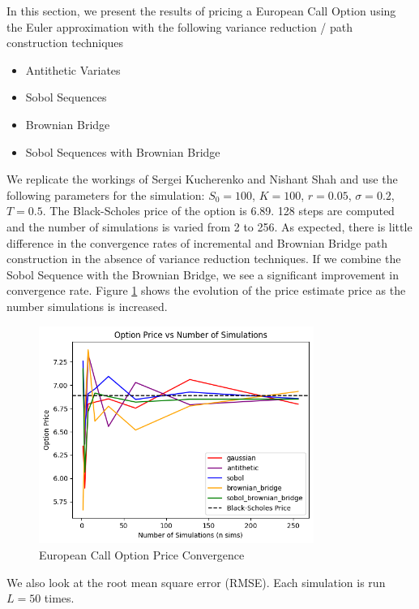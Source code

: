 \documentclass{article}
\newcommand{\para}{\vspace{8pt}} %
\begin{document}
In this section, we present the results of pricing a European Call Option using the Euler approximation with the following variance reduction / path construction techniques

\begin{itemize}
    \item Antithetic Variates
    \item Sobol Sequences
    \item Brownian Bridge
    \item Sobol Sequences with Brownian Bridge
\end{itemize}

We replicate the workings of Sergei Kucherenko and Nishant Shah \cite{sergei} and use
the following parameters for the simulation: $S_0 = 100$, $K = 100$, $r = 0.05$, $\sigma = 0.2$, $T = 0.5$.
The Black-Scholes price of the option is 6.89.  128 steps are computed and the number of simulations
is varied from 2 to 256.  As expected, there is little difference in the convergence rates of incremental and Brownian Bridge path 
construction in the absence of variance reduction techniques. If we combine the Sobol Sequence with the Brownian Bridge, we see 
a significant improvement in convergence rate. Figure \ref{fig:option_price} shows the evolution of the price estimate price as the number
simulations is increased.

\begin{figure}[h]
    \centering
    \includegraphics[width=0.8\textwidth]{images/option_price.png}
    \caption{European Call Option Price Convergence}
    \label{fig:option_price}
\end{figure}

\para
We also look at the root mean square error (RMSE). Each simulation is run $L=50$ times.
\end{document}
